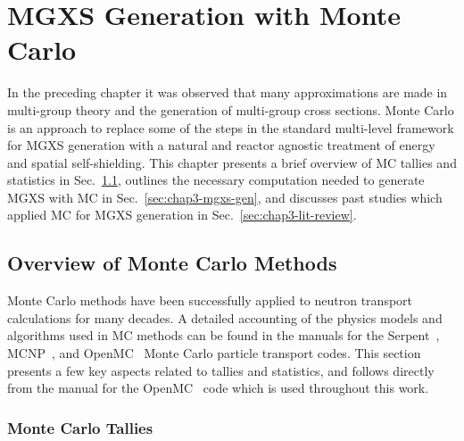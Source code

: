 \chapter{MGXS Generation with Monte Carlo}
\label{chap:mgxs-mc}

In the preceding chapter it was observed that many approximations are made in multi-group theory and the generation of multi-group cross sections. Monte Carlo is an approach to replace some of the steps in the standard multi-level framework for \ac{MGXS} generation with a natural and reactor agnostic treatment of energy and spatial self-shielding. This chapter presents a brief overview of \ac{MC} tallies and statistics in Sec.~\ref{sec:chap3-mc-overview}, outlines the necessary computation needed to generate \ac{MGXS} with \ac{MC} in Sec.~\ref{sec:chap3-mgxs-gen}, and discusses past studies which applied \ac{MC} for \ac{MGXS} generation in Sec.~\ref{sec:chap3-lit-review}.



\section{Overview of Monte Carlo Methods}
\label{sec:chap3-mc-overview}

Monte Carlo methods have been successfully applied to neutron transport calculations for many decades. A detailed accounting of the physics models and algorithms used in \ac{MC} methods can be found in the manuals for the Serpent~\cite{serpent2013manual}, MCNP~\cite{mcnpx2003manual}, and OpenMC~\cite{openmc2016manual} Monte Carlo particle transport codes. This section presents a few key aspects related to tallies and statistics, and follows directly from the manual for the OpenMC~\cite{openmc2016manual} code which is used throughout this work.

\subsection{Monte Carlo Tallies}
\label{subsec:chap3-mc-tallies}

